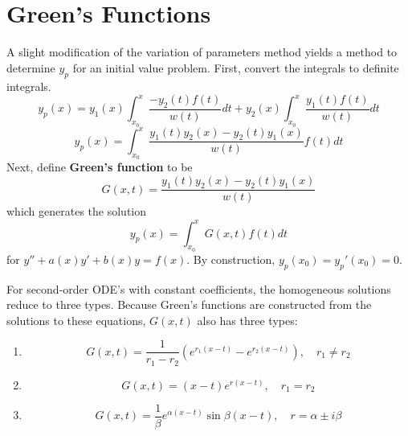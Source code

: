 \documentclass[11pt]{article}
\begin{document}
\section{Green's Functions}
	A slight modification of the variation of parameters method yields a method to determine $y_p$ for an initial value problem. First, convert the integrals to definite integrals.
	\begin{equation}
		y_p(x) = y_1(x) \int_{x_0}^x\frac{-y_2(t) f(t)}{w(t)}dt + y_2(x)\int_{x_0}^x\frac{y_1(t) f(t)}{w(t)}dt
	\end{equation}
	\begin{equation}
		y_p(x) = \int_{x_0}^x \frac{y_1(t) y_2(x) - y_2(t) y_1(x)}{w(t)}f(t)dt
	\end{equation}
	Next, define \textbf{Green's function} to be
	\begin{equation}
		G(x, t) = \frac{y_1(t) y_2(x) - y_2(t) y_1(x)}{w(t)}
	\end{equation}
	which generates the solution
	\begin{equation}
		y_p(x) = \int_{x_0}^x G(x,t)f(t)dt
	\end{equation}
	for $y'' + a(x)y' + b(x)y = f(x)$. By construction, $y_p(x_0) = y_p'(x_0) = 0$.
	
	For second-order ODE's with constant coefficients, the homogeneous solutions reduce to three types. Because Green's functions are constructed from the solutions to these equations, $G(x, t)$ also has three types:
	\begin{enumerate}
		\item
			\[G(x,t) = \frac{1}{r_1 - r_2}(e^{r_1(x-t)} - e^{r_2(x-t)}), \quad r_1 \neq r_2\]
		\item
			\[G(x,t) = (x-t)e^{r(x-t)}, \quad r_1 = r_2\]
		\item
			\[G(x,t) = \frac{1}{\beta}e^{\alpha(x-t)} \sin\beta(x-t), \quad r = \alpha \pm i\beta\]
	\end{enumerate}
	

%		
%		


\end{document}
